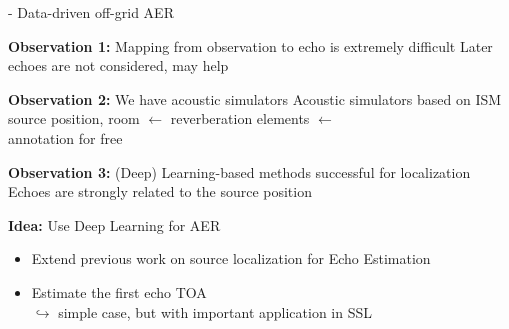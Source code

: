 \begin{frame}{\lantern - Data-driven off-grid AER}

    \begin{block}{\textbf{Observation 1:} Mapping from observation to echo is extremely difficult}
        Later echoes are not considered, may help
    \end{block}

    \begin{block}{\textbf{Observation 2:} We have acoustic simulators}
        Acoustic simulators based on ISM
        \\source position, room $\leftarrow$ reverberation elements $\leftarrow$
        \\annotation for free
    \end{block}

    \begin{block}{\textbf{Observation 3:} (Deep) Learning-based methods successful for localization}
        Echoes are strongly related to the source position
    \end{block}

    \begin{alertblock}{\textbf{Idea:} Use Deep Learning for AER}
        \begin{itemize}
            \item Extend previous work on source localization for Echo Estimation
            \item Estimate the first echo TOA
            \\$\hookrightarrow$ simple case, but with important application in SSL
        \end{itemize}
    \end{alertblock}

\end{frame}

